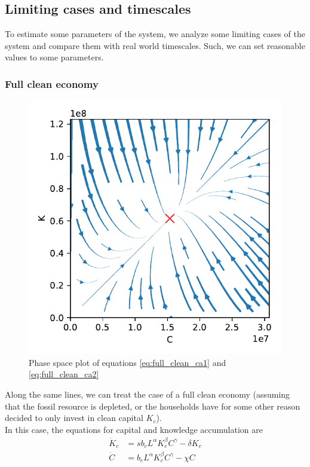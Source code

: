 \subsection{Limiting cases and timescales}

To estimate some parameters of the system, we analyze some limiting cases of the system and compare them with real world timescales. Such, we can set reasonable values to some parameters.


\subsubsection{Full clean economy}
\label{sec:full_clean_economy}

\begin{figure}
	\vspace{-1.8 cm}
	\includegraphics[width = .55 \textwidth]{./figures/phasespace.pdf}
        \caption{Phase space plot of equations \eqref{eq:full_clean_ca1} and \eqref{eq:full_clean_ca2} \label{phase_space_plot}}
\end{figure}
Along the same lines, we can treat the case of a full clean economy (assuming that the fossil resource is depleted, or the households have for some other reason decided to only invest in clean capital $K_c$). \\
In this case, the equations for capital and knowledge accumulation are
\begin{subequations}
\begin{align}
    \dot{K}_c &= s b_c L^{\alpha} K_c^{\beta} C^\gamma - \delta K_c \label{eq:full_clean_ca1} \\
	\dot{C} &= b_c L^\alpha K_c^\beta C^\gamma - \chi C \label{eq:full_clean_ca2}
\end{align}
\end{subequations}
